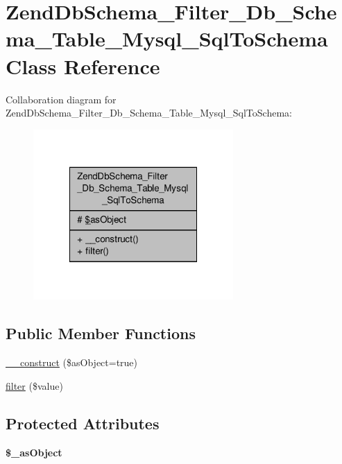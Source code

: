 \hypertarget{classZendDbSchema__Filter__Db__Schema__Table__Mysql__SqlToSchema}{\section{Zend\-Db\-Schema\-\_\-\-Filter\-\_\-\-Db\-\_\-\-Schema\-\_\-\-Table\-\_\-\-Mysql\-\_\-\-Sql\-To\-Schema Class Reference}
\label{classZendDbSchema__Filter__Db__Schema__Table__Mysql__SqlToSchema}
}


Collaboration diagram for Zend\-Db\-Schema\-\_\-\-Filter\-\_\-\-Db\-\_\-\-Schema\-\_\-\-Table\-\_\-\-Mysql\-\_\-\-Sql\-To\-Schema\-:\nopagebreak
\begin{figure}[H]
\begin{center}
\leavevmode
\includegraphics[width=216pt]{classZendDbSchema__Filter__Db__Schema__Table__Mysql__SqlToSchema__coll__graph}
\end{center}
\end{figure}
\subsection*{Public Member Functions}
\begin{DoxyCompactItemize}
\item 
\hyperlink{classZendDbSchema__Filter__Db__Schema__Table__Mysql__SqlToSchema_a0c87b613b451cbe6675fbe3ab95f9eac}{\-\_\-\-\_\-construct} (\$as\-Object=true)
\item 
\hyperlink{classZendDbSchema__Filter__Db__Schema__Table__Mysql__SqlToSchema_a90a7b3eac407b41ffb67b6ea297378b9}{filter} (\$value)
\end{DoxyCompactItemize}
\subsection*{Protected Attributes}
\begin{DoxyCompactItemize}
\item 
\hypertarget{classZendDbSchema__Filter__Db__Schema__Table__Mysql__SqlToSchema_a0078d48b9cdc9bf0a2eb5fd3f244d8ad}{{\bfseries \$\-\_\-as\-Object}}\label{classZendDbSchema__Filter__Db__Schema__Table__Mysql__SqlToSchema_a0078d48b9cdc9bf0a2eb5fd3f244d8ad}

\end{DoxyCompactItemize}


